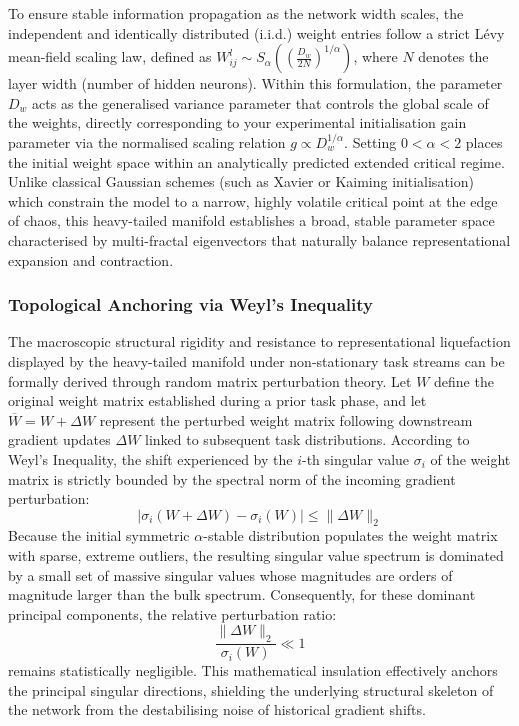 \documentclass[10pt,a4paper]{article}
\begin{document}
	To ensure stable information propagation as the network width scales, the independent and identically distributed (i.i.d.) weight entries follow a strict L\'evy mean-field scaling law, defined as $W_{ij}^{l} \sim S_{\alpha}\left(\left(\frac{D_w}{2N}\right)^{1/\alpha}\right)$, where $N$ denotes the layer width (number of hidden neurons). Within this formulation, the parameter $D_w$ acts as the generalised variance parameter that controls the global scale of the weights, directly corresponding to your experimental initialisation gain parameter via the normalised scaling relation $g \propto D_w^{1/\alpha}$. Setting $0 < \alpha < 2$ places the initial weight space within an analytically predicted extended critical regime. Unlike classical Gaussian schemes (such as Xavier or Kaiming initialisation) which constrain the model to a narrow, highly volatile critical point at the edge of chaos, this heavy-tailed manifold establishes a broad, stable parameter space characterised by multi-fractal eigenvectors that naturally balance representational expansion and contraction.
	
	\subsubsection{Topological Anchoring via Weyl's Inequality}
	The macroscopic structural rigidity and resistance to representational liquefaction displayed by the heavy-tailed manifold under non-stationary task streams can be formally derived through random matrix perturbation theory. Let $W$ define the original weight matrix established during a prior task phase, and let $\overline{W} = W + \Delta W$ represent the perturbed weight matrix following downstream gradient updates $\Delta W$ linked to subsequent task distributions. According to Weyl's Inequality, the shift experienced by the $i$-th singular value $\sigma_i$ of the weight matrix is strictly bounded by the spectral norm of the incoming gradient perturbation:
	\begin{equation}
		|\sigma_{i}(W + \Delta W) - \sigma_{i}(W)| \le \|\Delta W\|_2
	\end{equation}
	Because the initial symmetric $\alpha$-stable distribution populates the weight matrix with sparse, extreme outliers, the resulting singular value spectrum is dominated by a small set of massive singular values whose magnitudes are orders of magnitude larger than the bulk spectrum. Consequently, for these dominant principal components, the relative perturbation ratio:
	\begin{equation}
		\frac{\|\Delta W\|_2}{\sigma_i(W)} \ll 1
	\end{equation}
	remains statistically negligible. This mathematical insulation effectively anchors the principal singular directions, shielding the underlying structural skeleton of the network from the destabilising noise of historical gradient shifts.
	
\end{document}
